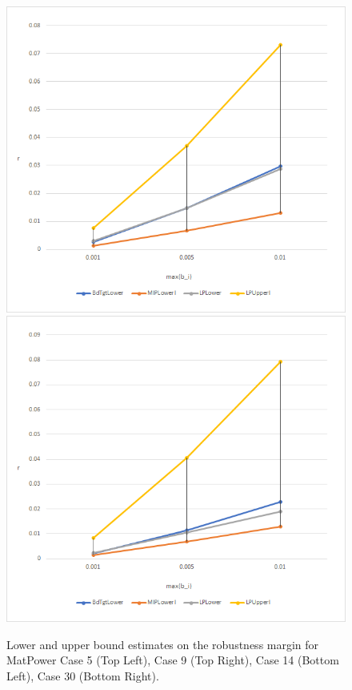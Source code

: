 \begin{figure}[htp!]
\begin{center}
\includegraphics[scale=0.45]{Figures/Case14.png}
\includegraphics[scale=0.45]{Figures/Case30.png}
\caption{Lower and upper bound estimates on the robustness margin for MatPower Case 5 (Top Left), Case 9 (Top Right), Case 14 (Bottom Left), Case 30 (Bottom Right).} 
\label{fig:Graphs1} 
\end{center}
\end{figure}


